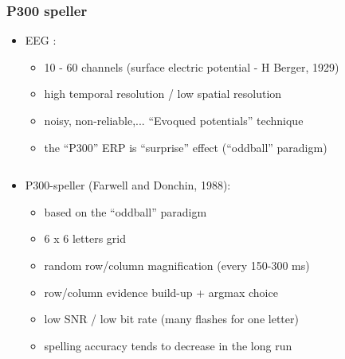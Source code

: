 \documentclass{beamer}
\begin{document}
\begin{frame} \frametitle{P300 speller}
	\vspace{-.8cm}
	\begin{itemize}
		\item EEG : 
	\vspace{-.1cm}		
		\begin{itemize}
			\item 10 - 60 channels (surface electric potential - H Berger, 1929)
			\item high temporal resolution / low spatial resolution
			\item noisy, non-reliable,... ``Evoqued potentials'' technique
			\item the ``P300'' ERP is ``surprise'' effect (``oddball'' paradigm)
		\end{itemize}
	\end{itemize}
	\vspace{-.3cm}
	\begin{columns}
		\begin{column}{0.75\linewidth}
			\begin{itemize}
				\item P300-speller (Farwell and Donchin, 1988):
				\begin{itemize}
					\item based on the ``oddball'' paradigm
					\item 6 x 6 letters grid
					\item random row/column magnification (every 150-300 ms)
					\item row/column evidence build-up + argmax choice
					\item low SNR / low bit rate (many flashes for one letter)
					\item spelling accuracy tends to decrease in the long run
				\end{itemize}
			\end{itemize}
		\end{column}
		\begin{column}{0.25\linewidth}
			\centerline{
}
\end{column}
\end{columns}
\end{frame}
\end{document}
